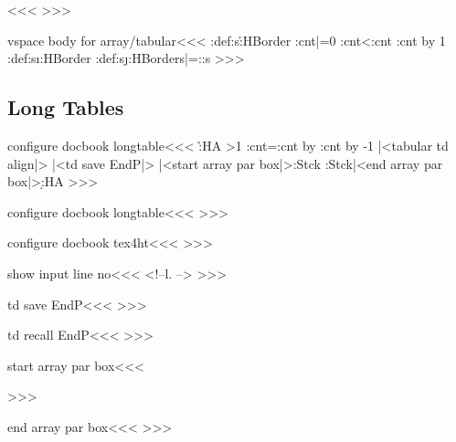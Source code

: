 \<\><<<
>>>

\<vspace body for array/tabular\><<<
\append:def\vspc:s{\h:HBorder}%
\def\:tempb{\ifnum \tmp:cnt<\ar:cnt 
    \advance\tmp:cnt by 1 \append:def\vspc:s{\i:HBorder}%
    \expandafter\:tempb
  \fi }
\tmp:cnt|=0 
\append:def\vspc:s{\j:HBorder}\global\let\vspc:s|=\vspc:s
>>>




\subsection{Long Tables}

\<configure docbook longtable\><<<
   {\IgnorePar\EndP 
    }
   {\ShowPar}
   {\halignTR\HCode{>}}
   {\r:HA}
   {%
    \halignTD
    \ifnum \HMultispan>1 
       \tmp:cnt=\HCol \advance\tmp:cnt by \HMultispan
       \advance\tmp:cnt by -1
       \fi
    |<tabular td align|>%
    |<td save EndP|>%
    |<start array par box|>\PushStack\Table:Stck\TableNo}
   {\PopStack\Table:Stck\TableNo |<end array par box|>\d:HA}
>>>



\<configure docbook longtable\><<<
\def\r:HA{\HCode{</row>}}
\def\d:HA{\ifvmode \IgnorePar \fi \EndP\HCode{</entry>}|<td recall EndP|>}
>>>


\<configure docbook tex4ht\><<<
\newif\ifHCond
>>>


\<show input line no\><<<
<!--l. \the{}-->%
>>>


\<td save EndP\><<<
\SaveEndP 
>>>

\<td recall EndP\><<<
\RecallEndP 
>>>

\<start array par box\><<<
\par  \ShowPar
>>>

\<end array par box\><<<
\IgnorePar \EndP
>>>








